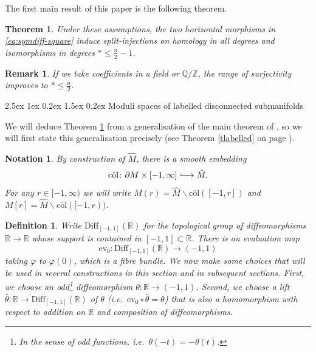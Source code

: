 \documentclass[reqno,a4paper]{article}
\makeatletter
\numberwithin{equation}{section}
\theoremstyle{italicised}
\newtheorem{athm}{Theorem}\renewcommand{\theathm}{\Alph{athm}}
\theoremstyle{upright}
\newtheorem{defn}[thm]{Definition}
\newtheorem{rmk}[thm]{Remark}
\newtheorem{notation}[thm]{Notation}
\theoremstyle{italicised-restate}
\renewcommand*{\section}{\@startsection{section}{1}{\z@}%
	{2.5ex \@plus 1ex \@minus 0.2ex}%
	{1.5ex \@plus 0.2ex}%
	{\normalfont\large\bfseries}}
\newcommand{\lhto}{\lhook\joinrel\longrightarrow}
\newcommand{\bQ}{\mathbb{Q}}
\newcommand{\bR}{\mathbb{R}}
\newcommand{\bZ}{\mathbb{Z}}
\renewcommand{\leq}{\leqslant}
\newcommand{\colhat}{\ensuremath{\mathrm{c}\hat{\mathrm{o}}\mathrm{l}}}
\makeatother
\begin{document}
The first main result of this paper is the following theorem.

\begin{athm}\label{tmain}
Under these assumptions, the two horizontal morphisms in \eqref{eq:symdiff-square} induce split-injections on homology in all degrees and isomorphisms in degrees $* \leq \tfrac{n}{2} - 1$.
\end{athm}

\begin{rmk}
If we take coefficients in a field or $\bQ/\bZ$, the range of surjectivity improves to $* \leq \tfrac{n}{2}$.
\end{rmk}


\section{Moduli spaces of labelled disconnected submanifolds}\label{s:mod-labelled}


We will deduce Theorem \ref{tmain} from a generalisation of the main theorem of \cite{Palmer2018HomologicalstabilitymoduliI}, so we will first state this generalisation precisely (see Theorem \ref{tlabelled} on page \pageref{tlabelled}).

\begin{notation}\label{not:Mr}
By construction of $\hat{M}$, there is a smooth embedding
\[
\colhat \colon \partial M \times [-1,\infty] \lhto \hat{M}.
\]
For any $r \in [-1,\infty)$ we will write $M(r) = \hat{M} \smallsetminus \colhat([-1,r])$ and $M[r] = \hat{M} \smallsetminus \colhat([-1,r))$.
\end{notation}

\begin{defn}
Write $\mathrm{Diff}_{[-1,1]}(\bR)$ for the topological group of diffeomorphisms $\bR \to \bR$ whose support is contained in $[-1,1] \subset \bR$. There is an evaluation map
\[
\mathrm{ev}_0 \colon \mathrm{Diff}_{[-1,1]}(\bR) \longrightarrow (-1,1)
\]
taking $\varphi$ to $\varphi(0)$, which is a fibre bundle. We now make some choices that will be used in several constructions in this section and in subsequent sections. First, we choose an odd\footnote{In the sense of odd functions, i.e.\ $\theta(-t) = -\theta(t)$.} diffeomorphism $\theta \colon \bR \to (-1,1)$. Second, we choose a lift $\bar{\theta} \colon \bR \to \mathrm{Diff}_{[-1,1]}(\bR)$ of $\theta$ (i.e.\ $\mathrm{ev}_0 \circ \bar{\theta} = \theta$) that is also a homomorphism with respect to addition on $\bR$ and composition of diffeomorphisms.
\end{defn}
\end{document}
